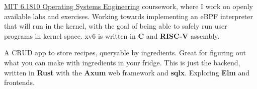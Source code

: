 \documentclass[9pt,letter,normalphoto]{altacv}
\begin{document}
  \divider
  





  \href{https://pdos.csail.mit.edu/6.1810/2023/xv6.html}{MIT 6.1810 Operating Systems Engineering} coursework, where I work on openly available labs and exercises.
  Working towards implementing an eBPF interpreter that will run in the kernel, with the goal of being able to safely run user programs in kernel space. 
  xv6 is written in \textbf{C} and \textbf{RISC-V} assembly.
  
  \divider
  A CRUD app to store recipes, queryable by ingredients. Great for figuring out what you can make with ingredients in your fridge.
  This is just the backend, written in \textbf{Rust} with the \textbf{Axum} web framework and \textbf{sqlx}. Exploring \textbf{Elm} and  frontends.
  
\medskip
\end{document}
